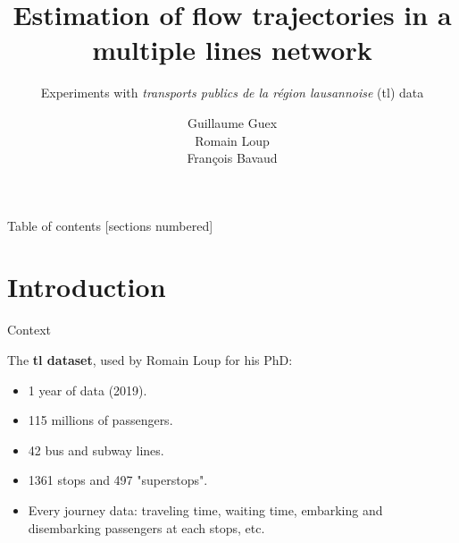 \documentclass[10pt]{beamer}
\title{Estimation of flow trajectories in a multiple lines network}
\subtitle{Experiments with \textit{transports publics de la région lausannoise} (tl) data}
\date{}
\author{Guillaume Guex \\ Romain Loup \\ François Bavaud}
\institute{University of Lausanne}
\newcommand{\imp}[1]{\textbf{\color{cyan}#1}}
\begin{document}
	
	
	\maketitle
	
	
	\begin{frame}{Table of contents}
		[sections numbered]
		\tableofcontents%
	\end{frame}

	
	\section[Introduction]{Introduction}
	
	
	\begin{frame}{Context}
		
		The \imp{tl dataset}, used by Romain Loup for his PhD:
		
		\begin{itemize}
			\item 1 year of data (2019).
			\item 115 millions of passengers.
			\item 42 bus and subway lines.
			\item 1361 stops and 497 "superstops".
			\item Every journey data: traveling time, waiting time, embarking and disembarking passengers at each stops, etc.
		\end{itemize}
		
	\end{frame}

	
\end{document}
